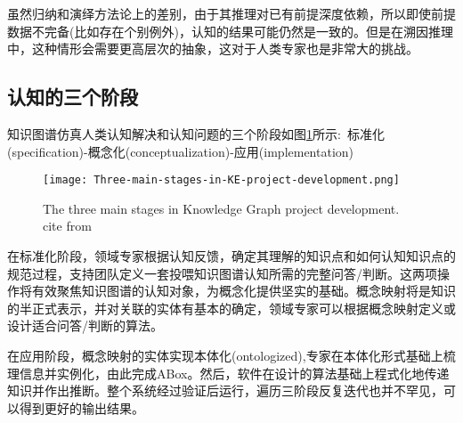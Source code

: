 虽然归纳和演绎方法论上的差别，由于其推理对已有前提深度依赖，所以即使前提数据不完备(比如存在个别例外)，认知的结果可能仍然是一致的。但是在溯因推理中，这种情形会需要更高层次的抽象，这对于人类专家也是非常大的挑战。

\subsection{认知的三个阶段}
知识图谱仿真人类认知解决和认知问题的三个阶段如图\ref{Fig:Three-main-stages-in-KE-pro-dev}所示:~标准化\textrm{(specification)}-概念化\textrm{(conceptualization)}-应用\textrm{(implementation)}
\begin{figure}[h!]
\centering
\texttt{[image: Three-main-stages-in-KE-project-development.png]}
\caption{\small\textrm{The three main stages in Knowledge Graph project development. cite from\cite{ACR56-128_2023}}}%
\label{Fig:Three-main-stages-in-KE-pro-dev}
\end{figure}
在标准化阶段，领域专家根据认知反馈，确定其理解的知识点和如何认知知识点的规范过程，支持团队定义一套投喂知识图谱认知所需的完整问答/判断。这两项操作将有效聚焦知识图谱的认知对象，为概念化提供坚实的基础。概念映射将是知识的半正式表示，并对关联的实体有基本的确定，领域专家可以根据概念映射定义或设计适合问答/判断的算法。

在应用阶段，概念映射的实体实现本体化\textrm{(ontologized)},专家在本体化形式基础上梳理信息并实例化，由此完成\textrm{ABox}。然后，软件在设计的算法基础上程式化地传递知识并作出推断。整个系统经过验证后运行，遍历三阶段反复迭代也并不罕见，可以得到更好的输出结果。

